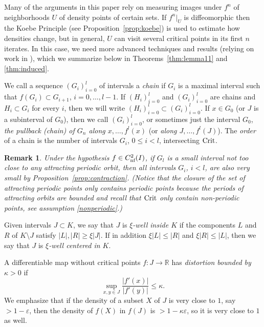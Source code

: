 \documentclass[12pt, psamsfonts, reqno]{amsart}
\newtheorem{remark}[theorem]{Remark}
\begin{document}
Many of the arguments in this paper rely on measuring images under
$f^n$ of neighborhoods $U$ of density points of certain sets. If
$f^n|_U$ is diffeomorphic then the Koebe Principle (see
Proposition~\ref{prop:koebe}) is used to estimate how densities
change, but in general, $U$ can visit several critical points in
its first $n$ iterates. In this case, we need more advanced
techniques and results (relying on work in \cite{BlMi,dMvS, vSV}),
which we summarize below in Theorems~\ref{thm:lemma11} and
\ref{thm:induced}.

We call a sequence $(G_i)_{i=0}^l$ of intervals  a \emph{chain} if
$G_i$ is a maximal interval such that $f(G_i)\subset G_{i+1}$,
$i=0,\ldots,l-1$. If  $(H_i)_{i=0}^l$ and $(G_i)_{i=0}^l$ are
chains and $H_i\subset G_i$ for every $i$, then we will write
$(H_i)_{i=0}^l\subset (G_i)_{i=0}^l$. If $x\in G_0$ (or $J$ is a
subinterval of $G_0$), then we call $(G_i)_{i=0}^l$, or sometimes
just the interval $G_0$, \emph{the pullback (chain) of $G_n$ along
$x,\ldots,f^l(x)$} (or \emph{along $J,\ldots,f^l(J)$}). The
\emph{order} of a chain is the number of intervals $G_i$, $0 \le
i<l$, intersecting ${\mathop{\rm Crit}\nolimits}$.
\begin{remark}
 \label{rem:regular}
Under the hypothesis $f\in {C^2_{\text{\rm nf}}}(I)$, if  $G_l$ is a small
interval not too close to any attracting periodic orbit,
then all intervals $G_i$, $i<l$, are also very small by
Proposition~\ref{prop:contraction}. (Notice that the closure of the
set of attracting periodic points only contains periodic points
because the periods of attracting orbits are bounded and recall
that ${\mathop{\rm Crit}\nolimits}$ only contain non-periodic points, see
assumption \eqref{nonperiodic}.)
\end{remark}

Given intervals $J \subset K$, we say that $J$ is {\em $\xi$-well
inside $K$} if the components $L$ and $R$ of $K \setminus J$
satisfy $|L|,|R|\geq \xi |J|$. If in addition $\xi |L|\leq |R|$
and $\xi |R|\leq |L|$, then we say that $J$ is {\em $\xi$-well
centered in $K$}.

A differentiable map without critical points $f:J\to
{{\mathbb R}}$ has \emph{distortion bounded by $\kappa>0$} if
\[
\sup_{x,y \in J} \frac{|f'(x)|}{|f'(y)|} \leq \kappa.
\]
We emphasize that if the density of a subset $X$ of $J$ is very
close to $1$, say $>1-{\varepsilon}$, then the density of $f(X)$ in $f(J)$
is $>1-\kappa{\varepsilon}$, so it is very close to $1$ as well.
\end{document}
